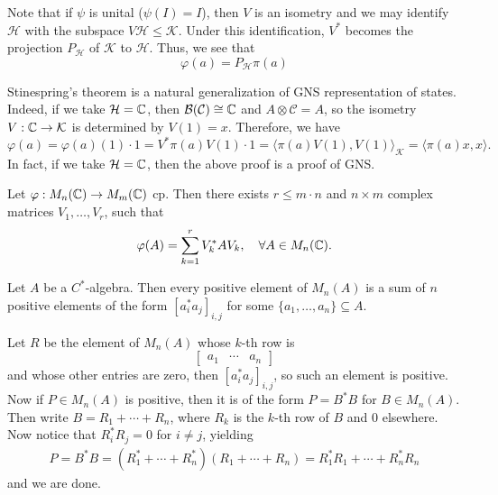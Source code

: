 Note that if $\psi$ is unital ($\psi (I) = I$), then $V$ is an isometry and we may identify $\mathcal{H}$
with the subspace $V \mathcal{H} \leq \mathcal{K}$.
Under this identification, $V^*$ becomes the projection $P_{\mathcal{H}}$ of $\mathcal{K}$
to $\mathcal{H}$. Thus, we see that 
$$\varphi(a) = P_{\mathcal{H}} \pi (a)$$

\begin{remark}
    Stinespring's theorem is a natural generalization of GNS representation of states.
    Indeed, if we take $\mathcal{H} = \mathbb {C}$, then $\mathcal{B} (\mathcal{C}) \cong \mathbb {C}$ and $A \otimes \mathcal{C} = A$,
    so the isometry $V : \mathbb {C}  \to \mathcal{K}$ is determined by $V (1) = x$.
    Therefore, we have 
    $$\varphi(a) = \varphi(a) (1) \cdot 1 = V^* \pi(a) V (1) \cdot 1 = \langle \pi (a) V(1), V(1) \rangle_{\mathcal{K}} = \langle \pi(a) x, x \rangle.$$
    In fact, if we take $\mathcal{H} = \mathbb {C}$, then the above proof is a proof of GNS. 
\end{remark}

\begin{theorem}
    Let $\varphi: M_n (\mathbb {C}) \to M_m (\mathbb {C})$ cp.
    Then there exists $r \leq m \cdot n$ and $n \times m$ complex matrices $V_1, \dots, V_r$,
    such that $$\varphi(A) = \sum_{k = 1} ^r V_k ^* A V_k,\quad \forall A \in M_n (\mathbb {C}).$$
\end{theorem}

\begin{lemma}\label{lem:7.1}
    Let $A$ be a $C^*$-algebra. Then every positive element of $M_n (A)$
    is a sum of $n$ positive elements of the form $[a_i ^* a_j]_{i, j}$ for some $\{a_1, \dots, a_n\} \subseteq A$.
\end{lemma}

\begin{myproof}
    Let $R$ be the element of $M_n (A)$ whose $k$-th row is $$\begin{bmatrix}
        a_1 & \cdots & a_n
    \end{bmatrix}$$
    and whose other entries are zero, then $[a_i ^* a_j]_{i, j}$, so such an element is positive.
    Now if $P \in M_n (A)$ is positive, then it is of the form $P = B^* B$ for $B \in M_n (A)$.
    Then write $B = R_1 + \cdots + R_n$, where $R_k$ is the $k$-th row of $B$ and $0$ elsewhere.
    Now notice that $R_i ^* R_j = 0$ for $i \neq j$, yielding 
    \begin{align*}
        P = B^* B = (R_1 ^* + \cdots + R_n ^*) (R_1 + \cdots + R_n) = R_1 ^* R_1 + \cdots + R_n ^* R_n
    \end{align*}
    and we are done.
\end{myproof}

